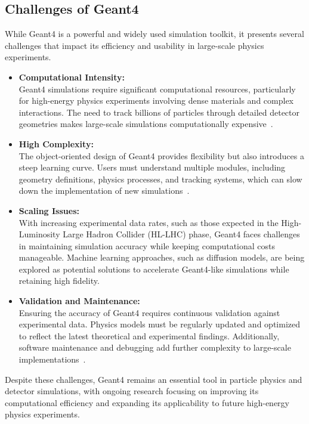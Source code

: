 \subsection{Challenges of Geant4}

While Geant4 is a powerful and widely used simulation toolkit, it presents several challenges that impact its efficiency and usability in large-scale physics experiments.

\begin{itemize}
    \item \textbf{Computational Intensity:} \\
    Geant4 simulations require significant computational resources, particularly for high-energy physics experiments involving dense materials and complex interactions. The need to track billions of particles through detailed detector geometries makes large-scale simulations computationally expensive~\cite{geant4_reference}.
    
    \item \textbf{High Complexity:} \\
    The object-oriented design of Geant4 provides flexibility but also introduces a steep learning curve. Users must understand multiple modules, including geometry definitions, physics processes, and tracking systems, which can slow down the implementation of new simulations~\cite{geant4_doc}.
    
    \item \textbf{Scaling Issues:} \\
    With increasing experimental data rates, such as those expected in the High-Luminosity Large Hadron Collider (HL-LHC) phase, Geant4 faces challenges in maintaining simulation accuracy while keeping computational costs manageable. Machine learning approaches, such as diffusion models, are being explored as potential solutions to accelerate Geant4-like simulations while retaining high fidelity.
    
    \item \textbf{Validation and Maintenance:} \\
    Ensuring the accuracy of Geant4 requires continuous validation against experimental data. Physics models must be regularly updated and optimized to reflect the latest theoretical and experimental findings. Additionally, software maintenance and debugging add further complexity to large-scale implementations~\cite{geant4_validation}.
\end{itemize}

Despite these challenges, Geant4 remains an essential tool in particle physics and detector simulations, with ongoing research focusing on improving its computational efficiency and expanding its applicability to future high-energy physics experiments.


